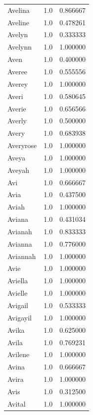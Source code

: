 \documentclass[
  letterpaper,
  DIV=11,
  numbers=noendperiod]{scrreprt}
\begin{document}
\begin{tabular}{lrr}
Avelina         &   1.0 &   0.866667 \\
Aveline         &   1.0 &   0.478261 \\
Avelyn          &   1.0 &   0.333333 \\
Avelynn         &   1.0 &   1.000000 \\
Aven            &   1.0 &   0.400000 \\
Averee          &   1.0 &   0.555556 \\
Averey          &   1.0 &   1.000000 \\
Averi           &   1.0 &   0.580645 \\
Averie          &   1.0 &   0.656566 \\
Averly          &   1.0 &   0.500000 \\
Avery           &   1.0 &   0.683938 \\
Averyrose       &   1.0 &   1.000000 \\
Aveya           &   1.0 &   1.000000 \\
Aveyah          &   1.0 &   1.000000 \\
Avi             &   1.0 &   0.666667 \\
Avia            &   1.0 &   0.437500 \\
Aviah           &   1.0 &   1.000000 \\
Aviana          &   1.0 &   0.431034 \\
Avianah         &   1.0 &   0.833333 \\
Avianna         &   1.0 &   0.776000 \\
Aviannah        &   1.0 &   1.000000 \\
Avie            &   1.0 &   1.000000 \\
Aviella         &   1.0 &   1.000000 \\
Avielle         &   1.0 &   1.000000 \\
Avigail         &   1.0 &   0.533333 \\
Avigayil        &   1.0 &   1.000000 \\
Avika           &   1.0 &   0.625000 \\
Avila           &   1.0 &   0.769231 \\
Avilene         &   1.0 &   1.000000 \\
Avina           &   1.0 &   0.666667 \\
Avira           &   1.0 &   1.000000 \\
Avis            &   1.0 &   0.312500 \\
Avital          &   1.0 &   1.000000 \\

\end{tabular}
\end{document}

